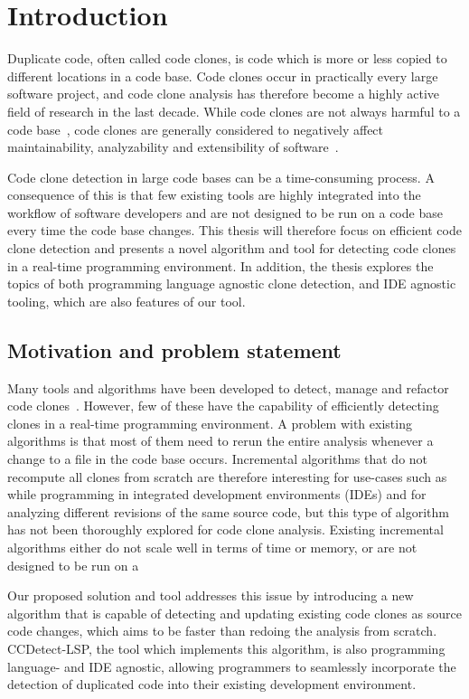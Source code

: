 \chapter{Introduction}

Duplicate code, often called code clones, is code which is more or less copied to
different locations in a code base. Code clones occur in practically every large software
project, and code clone analysis has therefore become a highly active field of research in
the last decade. While code clones are not always harmful to a code
base~\cite[209]{Inoue_introduction_to_cc}, code clones are generally considered to
negatively affect maintainability, analyzability and extensibility of
software~\cite[22]{Inoue_introduction_to_cc}.

Code clone detection in large code bases can be a time-consuming process. A consequence of
this is that few existing tools are highly integrated into the workflow of software
developers and are not designed to be run on a code base every time the code base changes.
This thesis will therefore focus on efficient code clone detection and presents a novel
algorithm and tool for detecting code clones in a real-time programming environment. In
addition, the thesis explores the topics of both programming language agnostic clone
detection, and IDE agnostic tooling, which are also features of our tool.

\section{Motivation and problem statement}

Many tools and algorithms have been developed to detect, manage and refactor code
clones~\cite[6]{Inoue_introduction_to_cc}. However, few of these have the capability of
efficiently detecting clones in a real-time programming environment. A problem with
existing algorithms is that most of them need to rerun the entire analysis whenever a
change to a file in the code base occurs. Incremental algorithms that do not recompute all
clones from scratch are therefore interesting for use-cases such as while programming in
integrated development environments (IDEs) and for analyzing different revisions of the
same source code, but this type of algorithm has not been thoroughly explored for code
clone analysis. Existing incremental algorithms either do not scale well in terms of time
or memory, or are not designed to be run on a 

Our proposed solution and tool addresses this issue by introducing a new algorithm that is
capable of detecting and updating existing code clones as source code changes, which aims
to be faster than redoing the analysis from scratch. CCDetect-LSP, the tool which
implements this algorithm, is also programming language- and IDE agnostic, allowing
programmers to seamlessly incorporate the detection of duplicated code into their existing
development environment.

